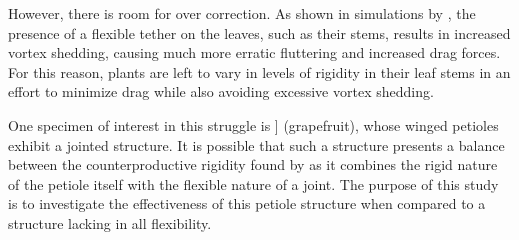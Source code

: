 However, there is room for over correction. As shown in simulations by \citep{miller, et al,2012}, the presence of a flexible tether on the leaves, such as their stems, results in increased vortex shedding, causing much more erratic fluttering and increased drag forces. For this reason, plants are left to vary in levels of rigidity in their leaf stems in an effort to minimize drag while also avoiding excessive vortex shedding. 
    
One specimen of interest in this struggle is \Citrusxparadisi] (grapefruit), whose winged petioles exhibit a jointed structure. It is possible that such a structure presents a balance between the counterproductive rigidity found by \citet{miller, et al,2012} as it combines the rigid nature of the petiole itself with the flexible nature of a joint. The purpose of this study is to investigate the effectiveness of this petiole structure when compared to a structure lacking in all flexibility.

